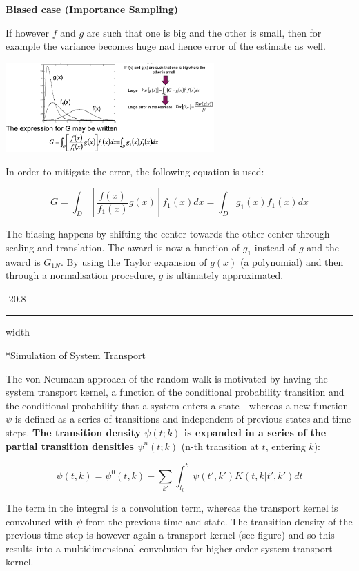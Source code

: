 \documentclass[8pt, landscape, fleqn]{scrartcl}
\makeatletter
\renewcommand{\subsubsection}{\@startsection{subsubsection}{1}{0mm}%
{-2\baselineskip}{0.8\baselineskip}%
{\hrule depth 0.2pt width\columnwidth\vspace*{1.2em}\normalsize\bfseries\rmfamily}}
\makeatother
\begin{document}
\begin{multicols*}{3}
\textbf{Biased case (Importance Sampling)}

If however $f$ and $g$ are such that one is big and the other is small, then for example the variance becomes huge nad hence error of the estimate as well. 

\includegraphics[width=8cm]{Images/BiasedSampling.png}

In order to mitigate the error, the following equation is used:

\begin{equation}
    G =  \int_D \left[ \frac{f(x)}{f_1(x)} g(x)\right] f_1(x) dx = \int_D g_1(x) f_1(x) dx
\end{equation}

The biasing happens by shifting the center towards the other center through scaling and translation. The award is now a function of $g_1$ instead of $g$ and the award is $G_{1N}$. By using the Taylor expansion of $g(x)$ (a polynomial) and then through a normalisation procedure, $g$ is ultimately approximated.

\subsubsection*{Simulation of System Transport}

The von Neumann approach of the random walk is motivated by having the system transport kernel, a function of the conditional probability transition and the conditional probability that a system enters a state - whereas a new function $\psi$ is defined as a series of transitions and independent of previous states and time steps. \textbf{The transition density $\psi(t;k)$ is expanded in a series of the partial transition densities $\psi^n(t;k)$} (n-th transition at $t$, entering $k$):

\begin{equation}
    \psi(t,k) = \psi^0(t,k) + \sum_{k'} \int_{t_0}^t \psi(t',k')K(t,k | t',k') dt
\end{equation}

The term in the integral is a convolution term, whereas the transport kernel is convoluted with $\psi$ from the previous time and state. The transition density of the previous time step is however again a transport kernel (see figure) and so this results into a multidimensional convolution for higher order system transport kernel. 


\end{multicols*}
\end{document}

